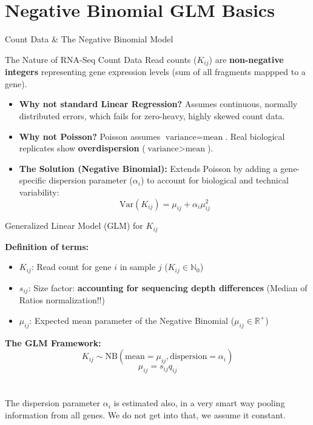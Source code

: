 \documentclass{beamer}
\begin{document}
\section{Negative Binomial GLM Basics}

\begin{frame}[fragile]{Count Data \& The Negative Binomial Model}

\begin{block}{The Nature of RNA-Seq Count Data}
Read counts ($K_{ij}$) are \textbf{non-negative integers} representing gene expression levels (sum of all fragments mappped to a gene).
\end{block}

\vspace{0.3em}
\begin{itemize}
    \item \textbf{Why not standard Linear Regression?} Assumes continuous, normally distributed errors, which fails for zero-heavy, highly skewed count data.
    \item \textbf{Why not Poisson?} Poisson assumes $\text{variance} = \text{mean}$. Real biological replicates show \textbf{overdispersion} ($\text{variance} > \text{mean}$).
    \item \textbf{The Solution (Negative Binomial):} 
    Extends Poisson by adding a gene-specific dispersion parameter ($\alpha_i$) to account for biological and technical variability:
    \[
    \text{Var}(K_{ij}) = \mu_{ij} + \alpha_i \mu_{ij}^2
    \]
\end{itemize}

\end{frame}

\begin{frame}[fragile]{Generalized Linear Model (GLM) for $K_{ij}$}

\small
\textbf{Definition of terms:}
\begin{itemize}
    \item $K_{ij}$: Read count for gene $i$ in sample $j$ ($K_{ij} \in \mathbb{N}_0$)
    \item $s_{ij}$: Size factor: \textbf{accounting for sequencing depth differences} (Median of Ratios normalization!!)
    \item $\mu_{ij}$: Expected mean parameter of the Negative Binomial ($\mu_{ij} \in \mathbb{R}^+$)
\end{itemize}

\vspace{0.2em}
\textbf{The GLM Framework:}
\[
K_{ij} \sim \text{NB}(\text{mean} = \mu_{ij}, \text{dispersion} = \alpha_i)
\]
\[
\mu_{ij} = s_{ij} q_{ij}
\]
\\~\\
The dispersion parameter $\alpha_i$ is estimated also, in a very smart way pooling information from all genes. We do not get into that, we assume it constant.

\end{frame}
\end{document}
